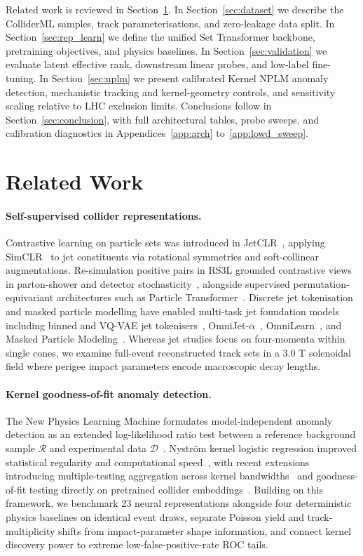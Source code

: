 \documentclass{article}
\begin{document}
Related work is reviewed in Section~\ref{sec:related}. In Section~\ref{sec:dataset} we describe the ColliderML samples, track parameterisations, and zero-leakage data split. In Section~\ref{sec:rep_learn} we define the unified Set Transformer backbone, pretraining objectives, and physics baselines. In Section~\ref{sec:validation} we evaluate latent effective rank, downstream linear probes, and low-label fine-tuning. In Section~\ref{sec:nplm} we present calibrated Kernel NPLM anomaly detection, mechanistic tracking and kernel-geometry controls, and sensitivity scaling relative to LHC exclusion limits. Conclusions follow in Section~\ref{sec:conclusion}, with full architectural tables, probe sweeps, and calibration diagnostics in Appendices~\ref{app:arch} to~\ref{app:lowd_sweep}.

\section{Related Work}
\label{sec:related}

\paragraph{Self-supervised collider representations.}
Contrastive learning on particle sets was introduced in JetCLR~\cite{JetCLR}, applying SimCLR~\cite{SimCLR} to jet constituents via rotational symmetries and soft-collinear augmentations. Re-simulation positive pairs in RS3L grounded contrastive views in parton-shower and detector stochasticity~\cite{ResimulationSSL}, alongside supervised permutation-equivariant architectures such as Particle Transformer~\cite{ParT}. Discrete jet tokenisation and masked particle modelling have enabled multi-task jet foundation models including binned and VQ-VAE jet tokenisers~\cite{BinnedTokenizationHEP}, OmniJet-$\alpha$~\cite{OmniJetAlpha}, OmniLearn~\cite{OmniLearn}, and Masked Particle Modeling~\cite{MPM}. Whereas jet studies focus on four-momenta within single cones, we examine full-event reconstructed track sets in a $3.0\text{ T}$ solenoidal field where perigee impact parameters encode macroscopic decay lengths.

\paragraph{Kernel goodness-of-fit anomaly detection.}
The New Physics Learning Machine formulates model-independent anomaly detection as an extended log-likelihood ratio test between a reference background sample $\mathcal{R}$ and experimental data $\mathcal{D}$~\cite{NPLM2019,NPLM2021}. Nystr\"om kernel logistic regression improved statistical regularity and computational speed~\cite{KernelNPLM2022,Wilks1938}, with recent extensions introducing multiple-testing aggregation across kernel bandwidths~\cite{GrossoLetizia2024} and goodness-of-fit testing directly on pretrained collider embeddings~\cite{NPLMEmbedding2025}. Building on this framework, we benchmark 23 neural representations alongside four deterministic physics baselines on identical event draws, separate Poisson yield and track-multiplicity shifts from impact-parameter shape information, and connect kernel discovery power to extreme low-false-positive-rate ROC tails.
\end{document}
